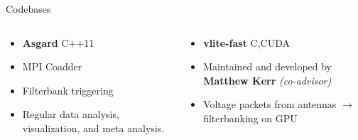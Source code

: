 \begin{frame}{Codebases}
\begin{columns}
	\begin{column}
	\begin{itemize}
		\item \textbf{\large Asgard} \hfill C++11
		\item MPI Coadder
		\item Filterbank triggering
		\item Regular data analysis, visualization, and meta analysis.
	\end{itemize}
	\end{column}

	\begin{column}
	\begin{itemize}
		\item \textbf{\large vlite-fast} \hfill C,CUDA
		\item Maintained and developed by \textbf{ Matthew Kerr } \emph{ (co-advisor) }
		\item Voltage packets from antennas $\to$ filterbanking on GPU
	\end{itemize}
	\end{column}
\end{columns}
\end{frame}
